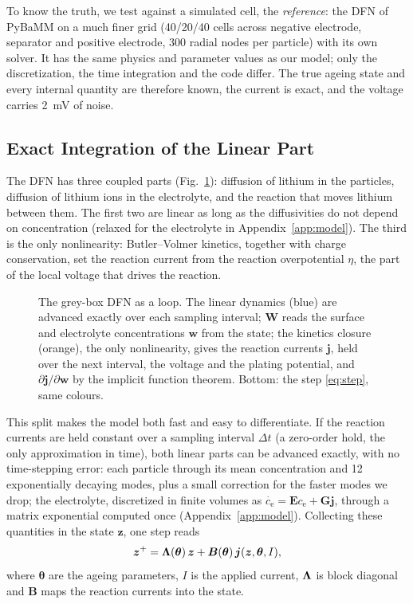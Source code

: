 \documentclass[journal]{IEEEtran}
\newcommand{\vz}{\bm{z}}\newcommand{\vj}{\bm{j}}\newcommand{\vy}{\bm{y}}\newcommand{\vw}{\bm{w}}
\newcommand{\vth}{\bm{\theta}}\newcommand{\vF}{\bm{F}}\newcommand{\mA}{\bm{A}}\newcommand{\mB}{\bm{B}}
\newcommand{\ce}{c_{\mathrm{e}}}\newcommand{\Ds}{D_{\mathrm{s}}}\newcommand{\Rf}{R_{\mathrm{f}}}
\begin{document}
To know the truth, we test against a simulated cell, the \emph{reference}: the DFN of PyBaMM\cite{pybamm} on a much finer grid (40/20/40 cells across negative electrode, separator and positive electrode, 300 radial nodes per particle) with its own solver. It has the same physics and parameter values as our model; only the discretization, the time integration and the code differ. The true ageing state and every internal quantity are therefore known, the current is exact, and the voltage carries \SI{2}{\milli\volt} of noise.

\subsection{Exact Integration of the Linear Part}
The DFN has three coupled parts (Fig.~\ref{fig:scheme}): diffusion of lithium in the particles, diffusion of lithium ions in the electrolyte, and the reaction that moves lithium between them. The first two are linear as long as the diffusivities do not depend on concentration (relaxed for the electrolyte in Appendix~\ref{app:model}). The third is the only nonlinearity: Butler--Volmer kinetics, together with charge conservation, set the reaction current from the reaction overpotential $\eta$, the part of the local voltage that drives the reaction.

\begin{figure}[t]
\centering

\caption{The grey-box DFN as a loop. The linear dynamics (blue) are advanced exactly over each sampling interval; $\bm W$ reads the surface and electrolyte concentrations $\bm w$ from the state; the kinetics closure (orange), the only nonlinearity, gives the reaction currents $\bm j$, held over the next interval, the voltage and the plating potential, and $\partial\bm j/\partial\bm w$ by the implicit function theorem. Bottom: the step \eqref{eq:step}, same colours.}
\label{fig:scheme}
\end{figure}

This split makes the model both fast and easy to differentiate. If the reaction currents are held constant over a sampling interval $\Delta t$ (a zero-order hold, the only approximation in time), both linear parts can be advanced exactly, with no time-stepping error: each particle through its mean concentration and 12 exponentially decaying modes, plus a small correction for the faster modes we drop; the electrolyte, discretized in finite volumes as $\dot{\ce}=\bm E\ce+\bm G\vj$, through a matrix exponential computed once (Appendix~\ref{app:model}). Collecting these quantities in the state $\vz$, one step reads
\begin{equation}
\vz^{+}=\mLam(\vth)\,\vz+\mB(\vth)\,\vj(\vz,\vth,I),
\label{eq:step}
\end{equation}
where $\vth$ are the ageing parameters, $I$ is the applied current, $\bm{\Lambda}$ is block diagonal and $\mB$ maps the reaction currents into the state.
\end{document}
